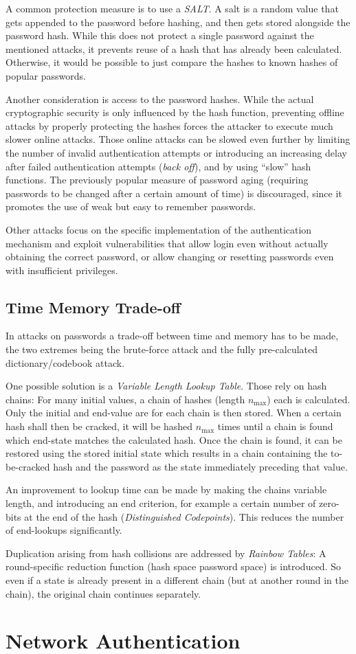 A common protection measure is to use a \emph{SALT}. A salt is a random value
that gets appended to the password before hashing, and then gets stored
alongside the password hash. While this does not protect a single password
against the mentioned attacks, it prevents reuse of a hash that has already been
calculated. Otherwise, it would be possible to just compare the hashes to known
hashes of popular passwords.

Another consideration is access to the password hashes. While the actual
cryptographic security is only influenced by the hash function, preventing
offline attacks by properly protecting the hashes forces the attacker to execute
much slower online attacks. Those online attacks can be slowed even further by
limiting the number of invalid authentication attempts or introducing an
increasing delay after failed authentication attempts (\textit{back off}), and
by using ``slow'' hash functions. The previously popular measure of password
aging (requiring passwords to be changed after a certain amount of time) is
discouraged, since it promotes the use of weak but easy to remember passwords.

Other attacks focus on the specific implementation of the authentication
mechanism and exploit vulnerabilities that allow login even without actually
obtaining the correct password, or allow changing or resetting passwords even
with insufficient privileges.

\subsection{Time Memory Trade-off}
In attacks on passwords a trade-off between time and memory has to be made, the
two extremes being the brute-force attack and the fully pre-calculated
dictionary/codebook attack.

One possible solution is a \emph{Variable Length Lookup Table}. Those rely on
hash chains: For many initial values, a chain of hashes (length $n_\text{max}$)
each is calculated. Only the initial and end-value are for each chain is then
stored. When a certain hash shall then be cracked, it will be hashed
$n_\text{max}$ times until a chain is found which end-state matches the
calculated hash. Once the chain is found, it can be restored using the stored
initial state which results in a chain containing the to-be-cracked hash and the
password as the state immediately preceding that value.

An improvement to lookup time can be made by making the chains variable length,
and introducing an end criterion, for example a certain number of zero-bits at
the end of the hash (\emph{Distinguished Codepoints}). This reduces the number
of end-lookups significantly.

Duplication arising from hash collisions are addressed by \emph{Rainbow Tables}:
A round-specific reduction function (hash space \textrightarrow password space)
is introduced. So even if a state is already present in a different chain (but
at another round in the chain), the original chain continues separately.

\section{Network Authentication}
